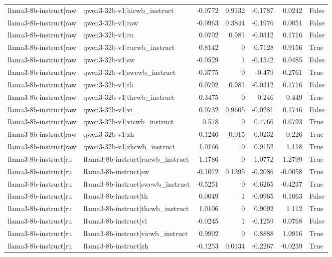 \begin{table}
\begin{tabular}{l l r r r r l}
llama3-8b-instruct|raw & qwen3-32b-v1|hicwb_instruct & -0.0772 & 0.9132 & -0.1787 & 0.0242 & False \\
llama3-8b-instruct|raw & qwen3-32b-v1|raw & -0.0963 & 0.3844 & -0.1976 & 0.0051 & False \\
llama3-8b-instruct|raw & qwen3-32b-v1|ru & 0.0702 & 0.981 & -0.0312 & 0.1716 & False \\
llama3-8b-instruct|raw & qwen3-32b-v1|rucwb_instruct & 0.8142 & 0 & 0.7128 & 0.9156 & True \\
llama3-8b-instruct|raw & qwen3-32b-v1|sw & -0.0529 & 1 & -0.1542 & 0.0485 & False \\
llama3-8b-instruct|raw & qwen3-32b-v1|swcwb_instruct & -0.3775 & 0 & -0.479 & -0.2761 & True \\
llama3-8b-instruct|raw & qwen3-32b-v1|th & 0.0702 & 0.981 & -0.0312 & 0.1716 & False \\
llama3-8b-instruct|raw & qwen3-32b-v1|thcwb_instruct & 0.3475 & 0 & 0.246 & 0.449 & True \\
llama3-8b-instruct|raw & qwen3-32b-v1|vi & 0.0732 & 0.9605 & -0.0281 & 0.1746 & False \\
llama3-8b-instruct|raw & qwen3-32b-v1|vicwb_instruct & 0.578 & 0 & 0.4766 & 0.6793 & True \\
llama3-8b-instruct|raw & qwen3-32b-v1|zh & 0.1246 & 0.015 & 0.0232 & 0.226 & True \\
llama3-8b-instruct|raw & qwen3-32b-v1|zhcwb_instruct & 1.0166 & 0 & 0.9152 & 1.118 & True \\
llama3-8b-instruct|ru & llama3-8b-instruct|rucwb_instruct & 1.1786 & 0 & 1.0772 & 1.2799 & True \\
llama3-8b-instruct|ru & llama3-8b-instruct|sw & -0.1072 & 0.1395 & -0.2086 & -0.0058 & True \\
llama3-8b-instruct|ru & llama3-8b-instruct|swcwb_instruct & -0.5251 & 0 & -0.6265 & -0.4237 & True \\
llama3-8b-instruct|ru & llama3-8b-instruct|th & 0.0049 & 1 & -0.0965 & 0.1063 & False \\
llama3-8b-instruct|ru & llama3-8b-instruct|thcwb_instruct & 1.0106 & 0 & 0.9092 & 1.112 & True \\
llama3-8b-instruct|ru & llama3-8b-instruct|vi & -0.0245 & 1 & -0.1259 & 0.0768 & False \\
llama3-8b-instruct|ru & llama3-8b-instruct|vicwb_instruct & 0.9902 & 0 & 0.8888 & 1.0916 & True \\
llama3-8b-instruct|ru & llama3-8b-instruct|zh & -0.1253 & 0.0134 & -0.2267 & -0.0239 & True \\

\end{tabular}
\end{table}
